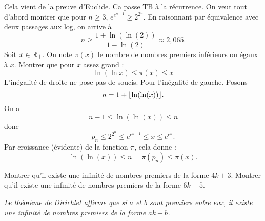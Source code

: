 \documentclass{magnolia}
\begin{document}
\begin{sol}
\begin{questions}
\question  Cela vient de la preuve d'Euclide.
\question  Ca passe TB à la récurrence.
\question  On veut tout d'abord montrer que pour $n\geq3$, $e^{e^{n-1}} \geq 2^{2^n}$. En raisonnant par équivalence avec deux passages aux log, on arrive à $$n\geq \dfrac{1+\ln(\ln(2))}{1-\ln(2)}\approx 2,065.$$
Soit $x\in\mathbb{R}_+$. On note $\pi(x)$ le nombre de nombres premiers inférieurs ou égaux à $x$. Montrer que pour $x$ assez grand :
  \[\ln(\ln x) \leq \pi(x) \leq x\]
  L'inégalité de droite ne pose pas de soucis.
  Pour l'inégalité de gauche. Posons $$n=1+\ent{\ln(\ln(x))}.$$
  On a $$n-1\leq \ln(\ln(x))\leq n$$ donc $$p_n\leq 2^{2^n}\leq e^{e^{n-1}}\leq x \leq e^{e^n}.$$ Par croissance (évidente) de la fonction $\pi$, cela donne :
  $$\ln(\ln(x))\leq n=\pi(p_n)\leq \pi(x).$$
\end{questions}
\end{sol}

\begin{questions}
\question Montrer qu'il existe une infinité de nombres premiers de la forme
  $4k+3$.
\question Montrer qu'il existe une infinité de nombres premiers de la forme
  $6k+5$.
\end{questions}
{\it Le théorème de {\sc Dirichlet} affirme que si $a$ et $b$ sont premiers entre eux, il existe une infinité de nombres premiers de la forme $ak+b$.}
\end{document}
